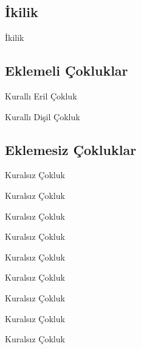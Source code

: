 \subsection*{İkilik}
\begin{kip}{}{İkilik}
\end{kip}

\subsection*{Eklemeli Çokluklar}
\begin{kip}{}{Kurallı Eril Çokluk}
\end{kip}

\begin{kip}{}{Kurallı Dişil Çokluk}
\end{kip}

\subsection*{Eklemesiz Çokluklar}
\begin{kip}{}{Kuralsız Çokluk}
\end{kip}

\begin{kip}{}{Kuralsız Çokluk}
\end{kip}

\begin{kip}{}{Kuralsız Çokluk}
\end{kip}

\begin{kip}{}{Kuralsız Çokluk}
\end{kip}

\begin{kip}{}{Kuralsız Çokluk}
\end{kip}

\begin{kip}{}{Kuralsız Çokluk}
\end{kip}

\begin{kip}{}{Kuralsız Çokluk}
\end{kip}

\begin{kip}{}{Kuralsız Çokluk}
\end{kip}

\begin{kip}{}{Kuralsız Çokluk}
\end{kip}

